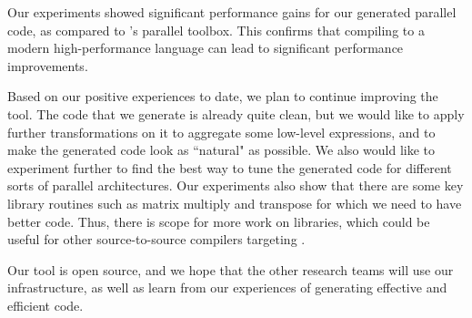 Our experiments showed significant performance gains for our generated
parallel \xten code, as compared to \matlab's parallel toolbox. This
confirms that compiling \matlab to a modern high-performance language
can lead to significant performance improvements. 

Based on our positive experiences to date,  we plan to continue
improving the \mixten tool.   The code that we generate is already quite
clean,  but we would like to apply further transformations on it to
aggregate some low-level expressions, and to make the generated code
look as ``natural" as possible.    We also would like to experiment
further to find the best way to tune the generated code for different
sorts of parallel architectures.   Our experiments also show that there
are some key library routines such as matrix multiply and transpose for
which we need to have better \xten code.   Thus, there is scope for more
work on \xten libraries, which could be useful for other
source-to-source compilers targeting \xten.

Our tool is open source, and we hope that the other research teams will use
our infrastructure, as well as learn from our experiences of generating
effective and efficient \xten code.
